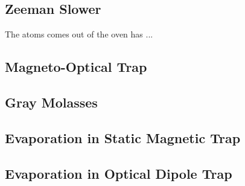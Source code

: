 \subsection{Zeeman Slower}

The atoms comes out of the oven has ...\\

\subsection{Magneto-Optical Trap}

\subsection{Gray Molasses}

\subsection{Evaporation in Static Magnetic Trap}

\subsection{Evaporation in Optical Dipole Trap}
